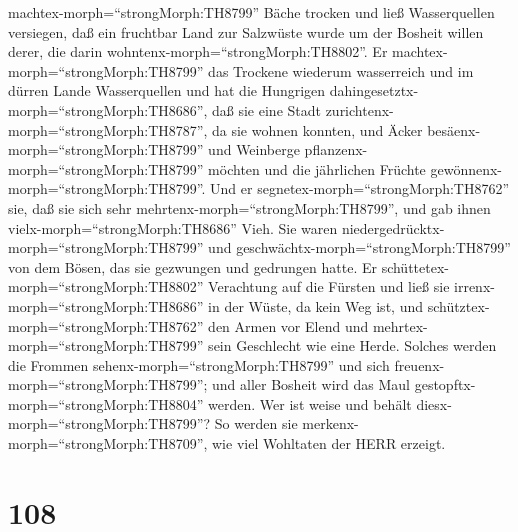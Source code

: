 machtex-morph=``strongMorph:TH8799'' Bäche trocken und ließ
Wasserquellen versiegen,  daß ein fruchtbar Land zur
Salzwüste wurde um der Bosheit willen derer, die darin
wohntenx-morph=``strongMorph:TH8802''.  Er
machtex-morph=``strongMorph:TH8799'' das Trockene wiederum wasserreich
und im dürren Lande Wasserquellen  und hat die Hungrigen
dahingesetztx-morph=``strongMorph:TH8686'', daß sie eine Stadt
zurichtenx-morph=``strongMorph:TH8787'', da sie wohnen konnten,
 und Äcker besäenx-morph=``strongMorph:TH8799'' und
Weinberge pflanzenx-morph=``strongMorph:TH8799'' möchten und die
jährlichen Früchte gewönnenx-morph=``strongMorph:TH8799''. 
Und er segnetex-morph=``strongMorph:TH8762'' sie, daß sie sich sehr
mehrtenx-morph=``strongMorph:TH8799'', und gab ihnen
vielx-morph=``strongMorph:TH8686'' Vieh.  Sie waren
niedergedrücktx-morph=``strongMorph:TH8799'' und
geschwächtx-morph=``strongMorph:TH8799'' von dem Bösen, das sie
gezwungen und gedrungen hatte.  Er
schüttetex-morph=``strongMorph:TH8802'' Verachtung auf die Fürsten und
ließ sie irrenx-morph=``strongMorph:TH8686'' in der Wüste, da kein Weg
ist,  und schütztex-morph=``strongMorph:TH8762'' den Armen
vor Elend und mehrtex-morph=``strongMorph:TH8799'' sein Geschlecht wie
eine Herde.  Solches werden die Frommen
sehenx-morph=``strongMorph:TH8799'' und sich
freuenx-morph=``strongMorph:TH8799''; und aller Bosheit wird das Maul
gestopftx-morph=``strongMorph:TH8804'' werden.  Wer ist
weise und behält diesx-morph=``strongMorph:TH8799''? So werden sie
merkenx-morph=``strongMorph:TH8709'', wie viel Wohltaten der HERR
erzeigt.

\hypertarget{section-107}{%
\section{108}\label{section-107}}

